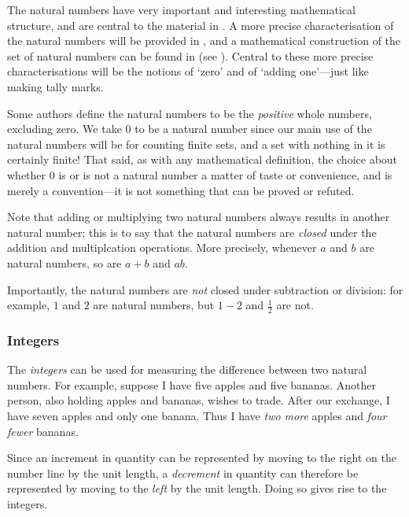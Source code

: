 The natural numbers have very important and interesting mathematical structure, and are central to the material in . A more precise characterisation of the natural numbers will be provided in , and a mathematical construction of the set of natural numbers can be found in  (see ). Central to these more precise characterisations will be the notions of `zero' and of `adding one'---just like making tally marks.

\begin{aside}
Some authors define the natural numbers to be the \textit{positive} whole numbers, excluding zero. We take $0$ to be a natural number since our main use of the natural numbers will be for counting finite sets, and a set with nothing in it is certainly finite! That said, as with any mathematical definition, the choice about whether $0$ is or is not a natural number a matter of taste or convenience, and is merely a convention---it is not something that can be proved or refuted.
\end{aside}

Note that adding or multiplying two natural numbers always results in another natural number; this is to say that the natural numbers are \textit{closed} under the addition and multiplcation operations. More precisely, whenever $a$ and $b$ are natural numbers, so are $a+b$ and $ab$.

Importantly, the natural numbers are \textit{not} closed under subtraction or division: for example, $1$ and $2$ are natural numbers, but $1-2$ and $\frac{1}{2}$ are not.

\subsubsection*{Integers}

The \textit{integers} can be used for measuring the difference between two natural numbers. For example, suppose I have five apples and five bananas. Another person, also holding apples and bananas, wishes to trade. After our exchange, I have seven apples and only one banana. Thus I have \textit{two more} apples and \textit{four fewer} bananas.

Since an increment in quantity can be represented by moving to the right on the number line by the unit length, a \textit{decrement} in quantity can therefore be represented by moving to the \textit{left} by the unit length. Doing so gives rise to the integers.

